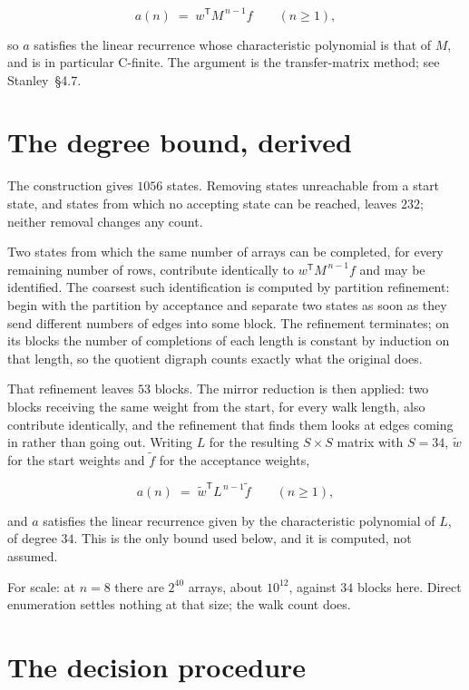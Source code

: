 \documentclass[11pt]{article}
\theoremstyle{definition}
\begin{document}
\[a(n) \;=\; w^{\mathsf T} M^{\,n-1} f \qquad (n \ge 1),\]

so $a$ satisfies the linear recurrence whose characteristic polynomial is that of $M$, and is in particular C-finite. The argument is the transfer-matrix method; see Stanley~\S4.7.

\section{The degree bound, derived}

The construction gives $1056$ states. Removing states unreachable from a start state, and states from which no accepting state can be reached, leaves $232$; neither removal changes any count.

Two states from which the same number of arrays can be completed, for every remaining number of rows, contribute identically to $w^{\mathsf T}M^{\,n-1}f$ and may be identified. The coarsest such identification is computed by partition refinement: begin with the partition by acceptance and separate two states as soon as they send different numbers of edges into some block. The refinement terminates; on its blocks the number of completions of each length is constant by induction on that length, so the quotient digraph counts exactly what the original does.

That refinement leaves $53$ blocks. The mirror reduction is then applied: two blocks receiving the same weight from the start, for every walk length, also contribute identically, and the refinement that finds them looks at edges coming in rather than going out. Writing $L$ for the resulting $S \times S$ matrix with $S = 34$, $\tilde w$ for the start weights and $\tilde f$ for the acceptance weights,

\[a(n) \;=\; \tilde w^{\mathsf T} L^{\,n-1} \tilde f \qquad (n \ge 1),\]

and $a$ satisfies the linear recurrence given by the characteristic polynomial of $L$, of degree $34$. This is the only bound used below, and it is computed, not assumed.

For scale: at $n = 8$ there are $2^{40}$ arrays, about $10^{12}$, against $34$ blocks here. Direct enumeration settles nothing at that size; the walk count does.

\section{The decision procedure}
\end{document}
